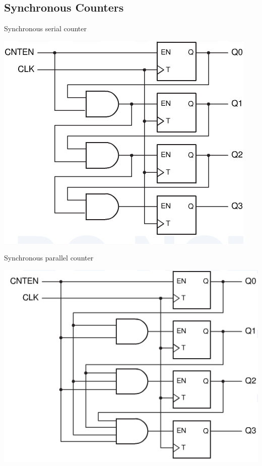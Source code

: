 \subsection{Synchronous Counters}

\begin{frame}{Synchronous serial counter}
  \begin{center}
    \includegraphics[scale=0.5]{SynchronousSerialCounter}
  \end{center}
\end{frame}

\begin{frame}{Synchronous parallel counter}
  \begin{center}
    \includegraphics[scale=0.5]{SynchronousParallelCounter}
  \end{center}
\end{frame}

